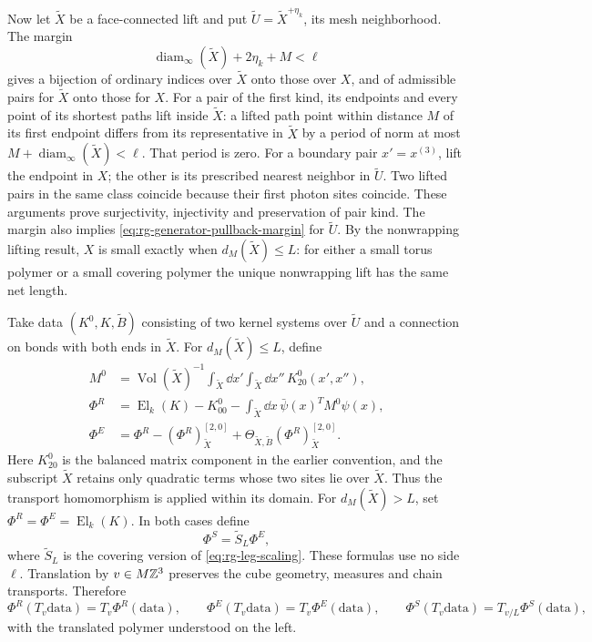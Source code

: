 Now let $\widetilde X$ be a face-connected lift and put
$\widetilde U=\widetilde X^{+\eta_k}$, its mesh
neighborhood. The margin
\begin{equation}\label{eq:rg-activity-pullback-margin}
 \operatorname{diam}_\infty(\widetilde X)+2\eta_k+M<\ell
\end{equation}
gives a bijection of ordinary indices over
$\widetilde X$ onto those over $X$, and of admissible
pairs for $\widetilde X$ onto those for $X$.
For a pair of the first kind, its endpoints and every
point of its shortest paths lift inside $\widetilde X$:
a lifted path point within distance $M$ of its first
endpoint differs from its representative in
$\widetilde X$ by a period of norm at most
$M+\operatorname{diam}_\infty(\widetilde X)<\ell$.
That period is zero. For a boundary pair
$x'=x^{(3)}$, lift the endpoint in $X$; the other is
its prescribed nearest neighbor in $\widetilde U$.
Two lifted pairs in the same class coincide because
their first photon sites coincide.
These arguments prove surjectivity, injectivity and
preservation of pair kind.
The margin also implies
\eqref{eq:rg-generator-pullback-margin} for $\widetilde U$.
By the nonwrapping lifting result, $X$ is small exactly
when $d_M(\widetilde X)\le L$: for either a small torus
polymer or a small covering polymer the unique
nonwrapping lift has the same net length.

Take data $(K^0,K,\widetilde B)$ consisting of two
kernel systems over $\widetilde U$ and a connection
on bonds with both ends in $\widetilde X$.
For $d_M(\widetilde X)\le L$, define
\begin{equation}\label{eq:rg-lifted-extraction}
 \begin{split}
 M^0&=\operatorname{Vol}(\widetilde X)^{-1}
      \int_{\widetilde X}\dd x'\int_{\widetilde X}\dd x''\,
                                                    K^0_{20}(x',x''),\\
 \Phi^R&=\operatorname{El}_k(K)-K^0_{00}
               -\int_{\widetilde X}\dd x\,\bar\psi(x)^TM^0\psi(x),\\
 \Phi^E&=\Phi^R-(\Phi^R)^{[2,0]}_{\widetilde X}
               +\Theta_{\widetilde X,\widetilde B}
                                      (\Phi^R)^{[2,0]}_{\widetilde X}.
 \end{split}
\end{equation}
Here $K^0_{20}$ is the balanced matrix component in the
earlier convention, and the subscript $\widetilde X$
retains only quadratic terms whose two sites lie over
$\widetilde X$. Thus the transport homomorphism is
applied within its domain. For $d_M(\widetilde X)>L$,
set $\Phi^R=\Phi^E=\operatorname{El}_k(K)$. In both
cases define
\[
 \Phi^S=\widetilde S_L\Phi^E,
\]
where $\widetilde S_L$ is the covering version of
\eqref{eq:rg-leg-scaling}. These formulas use no side
$\ell$. Translation by $v\in M\mathbb Z^3$ preserves the
cube geometry, measures and chain transports. Therefore
\begin{equation}\label{eq:rg-lifted-translation}
 \Phi^R(T_v\mathrm{data})=T_v\Phi^R(\mathrm{data}),\qquad
 \Phi^E(T_v\mathrm{data})=T_v\Phi^E(\mathrm{data}),\qquad
 \Phi^S(T_v\mathrm{data})=T_{v/L}\Phi^S(\mathrm{data}),
\end{equation}
with the translated polymer understood on the left.


